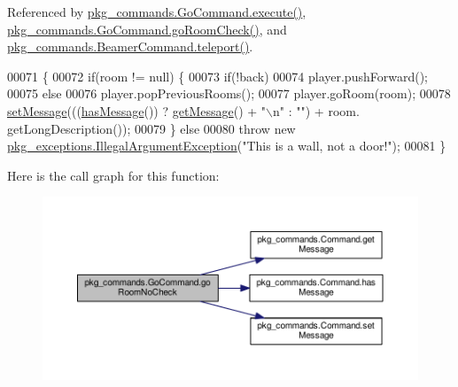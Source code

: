Referenced by \hyperlink{GoCommand_8java_source_l00032}{pkg\-\_\-commands.\-Go\-Command.\-execute()}, \hyperlink{GoCommand_8java_source_l00056}{pkg\-\_\-commands.\-Go\-Command.\-go\-Room\-Check()}, and \hyperlink{BeamerCommand_8java_source_l00050}{pkg\-\_\-commands.\-Beamer\-Command.\-teleport()}.


\begin{DoxyCode}
00071                                                                                                            
                   \{
00072         \textcolor{keywordflow}{if}(room != null) \{
00073             \textcolor{keywordflow}{if}(!back)
00074                 player.pushForward();
00075             \textcolor{keywordflow}{else}
00076                 player.popPreviousRooms();
00077             player.goRoom(room);
00078             \hyperlink{classpkg__commands_1_1Command_ae210ff216fe908b111ba1c988a963d13}{setMessage}(((\hyperlink{classpkg__commands_1_1Command_ae46bb048d0fa705a5037a5204b530da2}{hasMessage}()) ? \hyperlink{classpkg__commands_1_1Command_ac2a42e2bab264821892daefaf9a18b6c}{getMessage}() + \textcolor{stringliteral}{"\(\backslash\)n"} : \textcolor{stringliteral}{""}) + room.
      getLongDescription());
00079         \} \textcolor{keywordflow}{else}
00080             \textcolor{keywordflow}{throw} \textcolor{keyword}{new} \hyperlink{classpkg__exceptions_1_1IllegalArgumentException}{pkg\_exceptions.IllegalArgumentException}(\textcolor{stringliteral}{"This
       is a wall, not a door!"});
00081     \}
\end{DoxyCode}


Here is the call graph for this function\-:
\nopagebreak
\begin{figure}[H]
\begin{center}
\leavevmode
\includegraphics[width=350pt]{classpkg__commands_1_1GoCommand_a210afbc5f3ef34d3ad5759d853c8f8c2_cgraph}
\end{center}
\end{figure}




